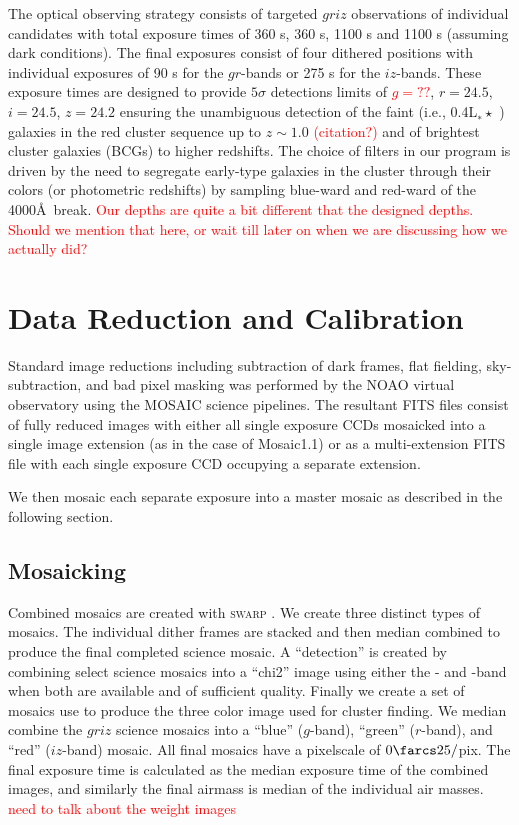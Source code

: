 \documentclass[apj, revtex4-1]{emulateapj}
\newcommand{\editorial}[1]{\textcolor{red}{#1}}
\begin{document}
The optical observing strategy consists of targeted $griz$ observations of individual candidates with total exposure times of 360 s, 360 s, 1100 s and 1100 s (assuming dark conditions). The final exposures consist of four dithered positions with individual exposures of 90 s for the $gr$-bands or 275 s for the $iz$-bands. These exposure times are designed to provide $5\sigma$ detections limits of \editorial{$g=??$}, $r = 24.5$, $i = 24.5$, $z = 24.2$ ensuring the unambiguous detection of the faint (i.e., 0.4L$_∗\star$ ) galaxies in the red cluster sequence up to $z \sim 1.0$ \editorial{(citation?)} and of brightest cluster galaxies (BCGs) to higher redshifts. The choice of filters in our program is driven by the need to segregate early-type galaxies in the cluster through their colors (or photometric redshifts) by sampling blue-ward and red-ward of the 4000\AA\ break. \editorial{Our depths are quite a bit different that the designed depths. Should we mention that here, or wait till later on when we are discussing how we actually did?}

\section{Data Reduction and Calibration}\label{sec:data reduction}
Standard image reductions including subtraction of dark frames, flat fielding, sky-subtraction, and bad pixel masking was performed by the NOAO virtual observatory using the MOSAIC \citep{Valdes2007} science pipelines. The resultant FITS files consist of fully reduced images with either all single exposure CCDs mosaicked into a single image extension (as in the case of Mosaic1.1) or as a multi-extension FITS file with each single exposure CCD occupying a separate extension.

We then mosaic each separate exposure into a master mosaic as described in the following section.

\subsection{Mosaicking}\label{sec:mosaicks}
Combined mosaics are created with \textsc{swarp} \citep{Bertin2002}. We create three distinct types of mosaics. The individual dither frames are stacked and then median combined to produce the final completed science mosaic. A ``detection'' is created by combining select science mosaics into a ``chi2'' image using either the \sdssi- and \sdssz-band when both are available and of sufficient quality. Finally we create a set of mosaics use to produce the three color image used for cluster finding. We median combine the $griz$ science mosaics into a ``blue'' ($g$-band), ``green'' ($r$-band), and ``red'' ($iz$-band) mosaic. All final mosaics have a pixelscale of $0\farcs25/$pix. The final exposure time is calculated as the median exposure time of the combined images, and similarly the final airmass is median of the individual air masses. \editorial{need to talk about the weight images}
\end{document}

